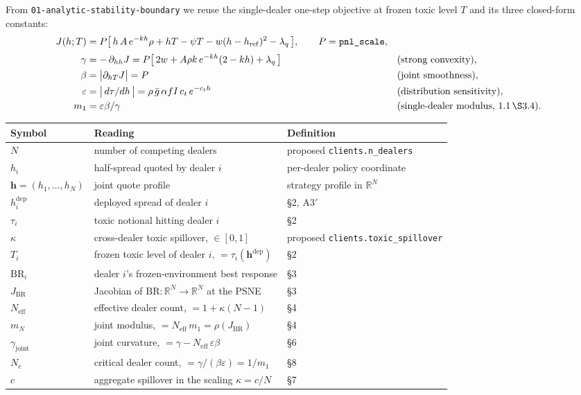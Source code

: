 \documentclass[11pt]{article}
\newcommand{\eps}{\varepsilon}
\newcommand{\gbar}{\bar g}
\newcommand{\hrefp}{h_{\mathrm{ref}}}
\newcommand{\code}[1]{\texttt{#1}}
\newcommand{\BR}{\mathrm{BR}}
\newcommand{\Neff}{N_{\mathrm{eff}}}
\newcommand{\gj}{\gamma_{\mathrm{joint}}}
\newcommand{\bvh}{\bm{h}}
\begin{document}
From \code{01-analytic-stability-boundary} we reuse the single-dealer one-step
objective at frozen toxic level $T$ and its three closed-form constants:
%
\begin{align*}
  J(h;T) &= P\big[\, h\,A\,e^{-kh}\rho + hT - \psi T - w(h-\hrefp)^2 - \lambda_q \,\big],
  \qquad P=\code{pnl\_scale},\\[2pt]
  \gamma &= -\,\partial_{hh}J = P\big[\,2w + A\rho k\,e^{-kh}(2-kh) + \lambda_q\,\big]
           &&\text{(strong convexity)},\\
  \beta  &= \big|\partial_{hT}J\big| = P &&\text{(joint smoothness)},\\
  \eps   &= \big|\,d\tau/dh\,\big| = \rho\,\gbar\,\alpha f I\,c_t\,e^{-c_t h}
           &&\text{(distribution sensitivity)},\\
  m_1    &= \eps\beta/\gamma &&\text{(single-dealer modulus, 1.1\,\S3.4).}
\end{align*}

\begin{center}
\begin{tabular}{@{}lll@{}}
\toprule
Symbol & Reading & Definition \\
\midrule
$N$            & number of competing dealers                       & proposed \code{clients.n\_dealers} \\
$h_i$          & half-spread quoted by dealer $i$                  & per-dealer policy coordinate \\
$\bvh=(h_1,\dots,h_N)$ & joint quote profile                       & strategy profile in $\mathbb{R}^N$ \\
$h_i^{\mathrm{dep}}$ & deployed spread of dealer $i$               & \S2, A3$'$ \\
$\tau_i$       & toxic notional hitting dealer $i$                 & \S2 \\
$\kappa$       & cross-dealer toxic spillover, $\in[0,1]$          & proposed \code{clients.toxic\_spillover} \\
$T_i$          & frozen toxic level of dealer $i$, $=\tau_i(\bvh^{\mathrm{dep}})$ & \S2 \\
$\BR_i$        & dealer $i$'s frozen-environment best response     & \S3 \\
$J_{\BR}$      & Jacobian of $\BR:\mathbb{R}^N\!\to\!\mathbb{R}^N$ at the PSNE & \S3 \\
$\Neff$        & effective dealer count, $=1+\kappa(N-1)$          & \S4 \\
$m_N$          & joint modulus, $=\Neff\,m_1=\rho(J_{\BR})$        & \S4 \\
$\gj$          & joint curvature, $=\gamma-\Neff\,\eps\beta$       & \S6 \\
$N_c$          & critical dealer count, $=\gamma/(\beta\eps)=1/m_1$& \S8 \\
$c$            & aggregate spillover in the scaling $\kappa=c/N$   & \S7 \\
\bottomrule
\end{tabular}
\end{center}
\end{document}
